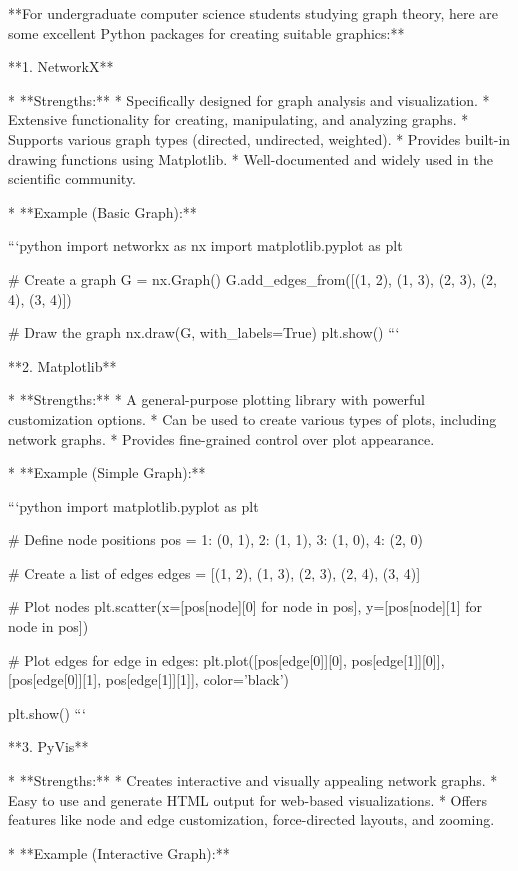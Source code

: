 **For undergraduate computer science students studying graph theory, here are some excellent Python packages for creating suitable graphics:**

**1. NetworkX**

*   **Strengths:**
    *   Specifically designed for graph analysis and visualization.
    *   Extensive functionality for creating, manipulating, and analyzing graphs.
    *   Supports various graph types (directed, undirected, weighted).
    *   Provides built-in drawing functions using Matplotlib.
    *   Well-documented and widely used in the scientific community.

*   **Example (Basic Graph):**

```python
import networkx as nx
import matplotlib.pyplot as plt

# Create a graph
G = nx.Graph()
G.add_edges_from([(1, 2), (1, 3), (2, 3), (2, 4), (3, 4)])

# Draw the graph
nx.draw(G, with_labels=True)
plt.show()
```

**2. Matplotlib**

*   **Strengths:**
    *   A general-purpose plotting library with powerful customization options.
    *   Can be used to create various types of plots, including network graphs.
    *   Provides fine-grained control over plot appearance.

*   **Example (Simple Graph):**

```python
import matplotlib.pyplot as plt

# Define node positions
pos = {1: (0, 1), 2: (1, 1), 3: (1, 0), 4: (2, 0)}

# Create a list of edges
edges = [(1, 2), (1, 3), (2, 3), (2, 4), (3, 4)]

# Plot nodes
plt.scatter(x=[pos[node][0] for node in pos], 
            y=[pos[node][1] for node in pos])

# Plot edges
for edge in edges:
    plt.plot([pos[edge[0]][0], pos[edge[1]][0]], 
             [pos[edge[0]][1], pos[edge[1]][1]], 
             color='black')

plt.show()
```

**3. PyVis**

*   **Strengths:**
    *   Creates interactive and visually appealing network graphs.
    *   Easy to use and generate HTML output for web-based visualizations.
    *   Offers features like node and edge customization, force-directed layouts, and zooming.

*   **Example (Interactive Graph):**

